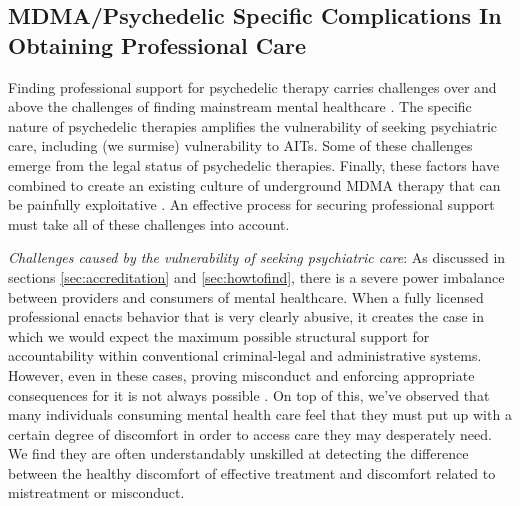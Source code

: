 \documentclass[12pt,letterpaper]{book}
\begin{document}
\subsection*{MDMA/Psychedelic Specific Complications In Obtaining Professional Care}
\label{sec:mdmaTherapistComplications}

Finding professional support for psychedelic therapy carries challenges over and above the challenges of finding mainstream mental healthcare \cite{studyingHarms,patientVulnerability}. The specific nature of psychedelic therapies amplifies the vulnerability of seeking psychiatric care, including (we surmise) vulnerability to AITs. Some of these challenges emerge from the legal status of psychedelic therapies. Finally, these factors have combined to create an existing culture of underground MDMA therapy that can be painfully exploitative \cite{powerTrip}. An effective process for securing professional support must take all of these challenges into account.

\textit{Challenges caused by the vulnerability of seeking psychiatric care}: As discussed in sections \ref{sec:accreditation} and \ref{sec:howtofind}, there is a severe power imbalance between providers and consumers of mental healthcare. When a fully licensed professional enacts behavior that is very clearly abusive, it creates the case in which we would expect the maximum possible structural support for accountability within conventional criminal-legal and administrative systems. However, even in these cases, proving misconduct and enforcing appropriate consequences for it is not always possible \cite{biaggio1998obstacles}. On top of this, we've observed that many individuals consuming mental health care feel that they must put up with a certain degree of discomfort in order to access care they may desperately need. We find they are often understandably unskilled at detecting the difference between the healthy discomfort of effective treatment \cite{eckerUnlocking} and discomfort related to mistreatment or misconduct. 
\end{document}
